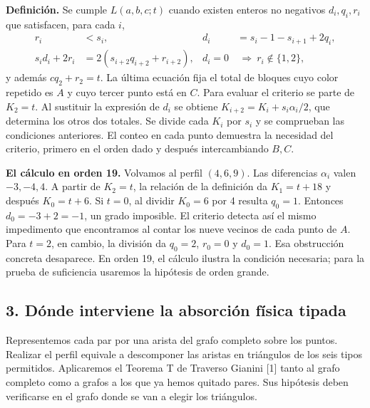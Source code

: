 \documentclass[spanish,11pt,a4paper]{article}
\begin{document}
\textbf{Definición.} Se cumple \(L(a,b,c;t)\) cuando existen enteros no negativos \(d_i,q_i,r_i\) que satisfacen, para cada \(i\), \[\begin{aligned}
 r_i&<s_i, & d_i&=s_i-1-s_{i+1}+2q_i,\\
 s_id_i+2r_i&=2(s_{i+2}q_{i+2}+r_{i+2}),&
 d_i=0&\ \Longrightarrow\ r_i\notin\{1,2\},
\end{aligned}\] y además \(cq_2+r_2=t\). La última ecuación fija el total de bloques cuyo color repetido es \(A\) y cuyo tercer punto está en \(C\). Para evaluar el criterio se parte de \(K_2=t\). Al sustituir la expresión de \(d_i\) se obtiene \(K_{i+2}=K_i+s_i\alpha_i/2\), que determina los otros dos totales. Se divide cada \(K_i\) por \(s_i\) y se comprueban las condiciones anteriores. El conteo en cada punto demuestra la necesidad del criterio, primero en el orden dado y después intercambiando \(B,C\).

\textbf{El cálculo en orden 19.} Volvamos al perfil \((4,6,9)\). Las diferencias \(\alpha_i\) valen \(-3,-4,4\). A partir de \(K_2=t\), la relación de la definición da \(K_1=t+18\) y después \(K_0=t+6\). Si \(t=0\), al dividir \(K_0=6\) por 4 resulta \(q_0=1\). Entonces \(d_0=-3+2=-1\), un grado imposible. El criterio detecta así el mismo impedimento que encontramos al contar los nueve vecinos de cada punto de \(A\). Para \(t=2\), en cambio, la división da \(q_0=2\), \(r_0=0\) y \(d_0=1\). Esa obstrucción concreta desaparece. En orden 19, el cálculo ilustra la condición necesaria; para la prueba de suficiencia usaremos la hipótesis de orden grande.

\subsection{3. Dónde interviene la absorción física tipada}\label{duxf3nde-interviene-la-absorciuxf3n-fuxedsica-tipada}

Representemos cada par por una arista del grafo completo sobre los puntos. Realizar el perfil equivale a descomponer las aristas en triángulos de los seis tipos permitidos. Aplicaremos el Teorema T de Traverso Gianini {[}1{]} tanto al grafo completo como a grafos a los que ya hemos quitado pares. Sus hipótesis deben verificarse en el grafo donde se van a elegir los triángulos.
\end{document}

